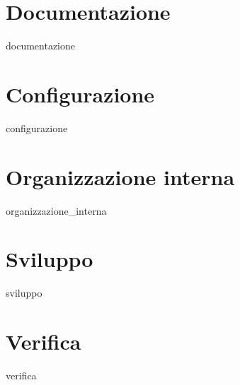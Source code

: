 \documentclass[a4paper,twoside,12pt]{article}
\begin{document}
	\newpage
	\section{Documentazione}
		{documentazione}

	\newpage
	\section{Configurazione}
		{configurazione}

	\newpage
	\section{Organizzazione interna}
		{organizzazione_interna}
		
	\newpage
	\section{Sviluppo}
		{sviluppo}
		
	\newpage
	\section{Verifica}
		{verifica}
\end{document}
